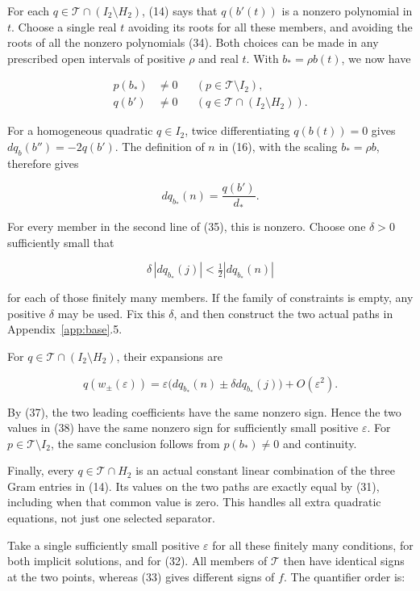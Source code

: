 \documentclass[11pt]{article}
\begin{document}
For each \(q\in\mathcal T\cap(I_2\setminus H_2)\), (14) says that
\(q(b'(t))\) is a nonzero polynomial in \(t\). Choose a single real \(t\)
avoiding its roots for all these members, and avoiding the roots of all the
nonzero polynomials (34). Both choices can be made in any prescribed open
intervals of positive \(\rho\) and real \(t\). With \(b_*=\rho b(t)\),
we now have

\[
\begin{aligned}
p(b_*)&\ne0&& (p\in\mathcal T\setminus I_2),\\
q(b')&\ne0&& (q\in\mathcal T\cap(I_2\setminus H_2)).
\end{aligned}
\tag{35}
\]

For a homogeneous quadratic \(q\in I_2\), twice differentiating
\(q(b(t))=0\) gives \(dq_b(b'')=-2q(b')\). The definition of \(n\) in
(16), with the scaling \(b_*=\rho b\), therefore gives

\[
dq_{b_*}(n)=\frac{q(b')}{d_*}.
\tag{36}
\]

For every member in the second line of (35), this is nonzero. Choose one
\(\delta>0\) sufficiently small that

\[
\delta\,|dq_{b_*}(j)|
 <\tfrac12|dq_{b_*}(n)|
\tag{37}
\]

for each of those finitely many members. If the family of constraints is
empty, any positive \(\delta\) may be used. Fix this \(\delta\), and then
construct the two actual paths in Appendix~\ref{app:base}.5.

For \(q\in\mathcal T\cap(I_2\setminus H_2)\), their expansions are

\[
q(w_\pm(\varepsilon))
 =\varepsilon\bigl(dq_{b_*}(n)\pm\delta dq_{b_*}(j)\bigr)
   +O(\varepsilon^2).
\tag{38}
\]

By (37), the two leading coefficients have the same nonzero sign. Hence the
two values in (38) have the same nonzero sign for sufficiently small
positive \(\varepsilon\). For \(p\in\mathcal T\setminus I_2\), the same
conclusion follows from \(p(b_*)\ne0\) and continuity.

Finally, every \(q\in\mathcal T\cap H_2\) is an actual constant linear
combination of the three Gram entries in (14). Its values on the two paths
are exactly equal by (31), including when that common value is zero. This
handles all extra quadratic equations, not just one selected separator.

Take a single sufficiently small positive \(\varepsilon\) for all these
finitely many conditions, for both implicit solutions, and for (32). All
members of \(\mathcal T\) then have identical signs at the two points,
whereas (33) gives different signs of \(f\). The quantifier order is:
\end{document}
